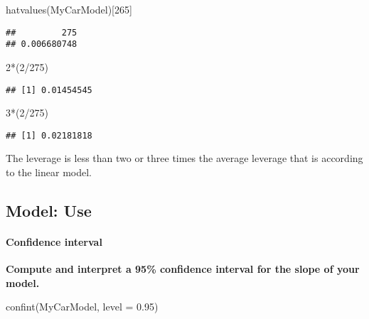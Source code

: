 \documentclass[
]{article}
\newenvironment{Shaded}{\begin{snugshade}}{\end{snugshade}}
\newcommand{\AttributeTok}[1]{\textcolor[rgb]{0.77,0.63,0.00}{#1}}
\newcommand{\DecValTok}[1]{\textcolor[rgb]{0.00,0.00,0.81}{#1}}
\newcommand{\FloatTok}[1]{\textcolor[rgb]{0.00,0.00,0.81}{#1}}
\newcommand{\FunctionTok}[1]{\textcolor[rgb]{0.00,0.00,0.00}{#1}}
\newcommand{\NormalTok}[1]{#1}
\newcommand{\SpecialCharTok}[1]{\textcolor[rgb]{0.00,0.00,0.00}{#1}}
\begin{document}
\begin{Shaded}
\begin{Highlighting}[]
\FunctionTok{hatvalues}\NormalTok{(MyCarModel)[}\DecValTok{265}\NormalTok{]}
\end{Highlighting}
\end{Shaded}

\begin{verbatim}
##         275 
## 0.006680748
\end{verbatim}

\begin{Shaded}
\begin{Highlighting}[]
\DecValTok{2}\SpecialCharTok{*}\NormalTok{(}\DecValTok{2}\SpecialCharTok{/}\DecValTok{275}\NormalTok{)}
\end{Highlighting}
\end{Shaded}

\begin{verbatim}
## [1] 0.01454545
\end{verbatim}

\begin{Shaded}
\begin{Highlighting}[]
\DecValTok{3}\SpecialCharTok{*}\NormalTok{(}\DecValTok{2}\SpecialCharTok{/}\DecValTok{275}\NormalTok{)}
\end{Highlighting}
\end{Shaded}

\begin{verbatim}
## [1] 0.02181818
\end{verbatim}

The leverage is less than two or three times the average leverage that
is according to the linear model.

\hypertarget{model-use}{%
\subsection{Model: Use}\label{model-use}}

\hypertarget{confidence-interval}{%
\paragraph{Confidence interval}\label{confidence-interval}}

\textbf{Compute and interpret a 95\% confidence interval for the slope
of your model.}

\begin{Shaded}
\begin{Highlighting}[]
\FunctionTok{confint}\NormalTok{(MyCarModel, }\AttributeTok{level =} \FloatTok{0.95}\NormalTok{)}
\end{Highlighting}
\end{Shaded}
\end{document}
